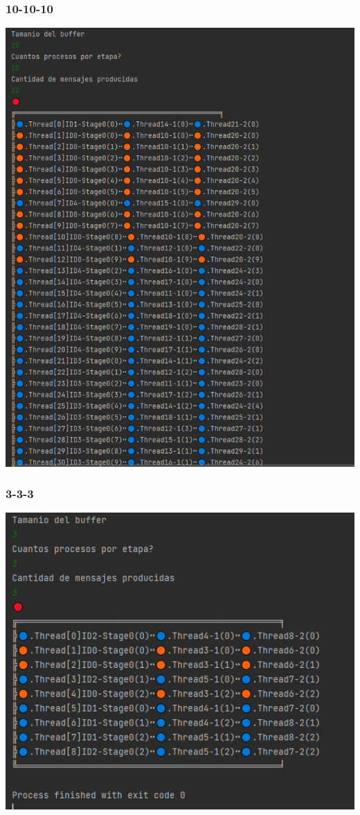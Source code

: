 \documentclass[a4paper]{article}
\begin{document}
\subsubsection{10-10-10}
\includegraphics{10-10-10.PNG}

\subsubsection{3-3-3}
\includegraphics{3-3-3.PNG}
\end{document}
